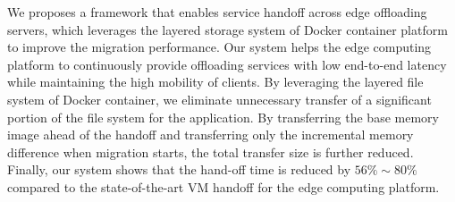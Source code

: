 We proposes a framework that enables service handoff across edge offloading servers, which leverages the layered storage system of Docker container platform to improve the migration performance.
Our system helps the edge computing platform to continuously provide offloading services with low end-to-end latency while maintaining the high mobility of clients. 
By leveraging the layered file system of Docker container, we eliminate unnecessary  transfer of a significant portion of the file system for the application. 
By transferring the base memory image ahead of the handoff and transferring only the incremental memory difference when migration starts, the total transfer size is further reduced. Finally, our system shows that the hand-off time is reduced by $56\%\sim 80\%$ compared to the state-of-the-art VM handoff for the edge computing platform.


